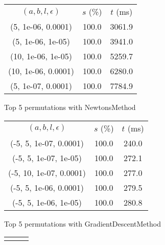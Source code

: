 \begin{figure}[H]
\label{fig:param_comp_NegativeEntropy_DichotomousSearch}
\begin{subfigure}[ht]{.5\textwidth}
\begin{tabular}{|c|c|c|}
\hline
\rowcolor{gray!25}
\multicolumn{3}{|c|}{NewtonsMethod} \\
\hline
\rowcolor{gray!25}
$(a,b,l,\epsilon)$ & $s$ (\%) & $t$ (ms) \\
\hline
(5, 1e-06, 0.0001) & 100.0 & 3061.9 \\
(5, 1e-06, 1e-05) & 100.0 & 3941.0 \\
(10, 1e-06, 1e-05) & 100.0 & 5259.7 \\
(10, 1e-06, 0.0001) & 100.0 & 6280.0 \\
(5, 1e-07, 0.0001) & 100.0 & 7784.9 \\
\hline
\end{tabular}
\caption{Top 5 permutations with NewtonsMethod}
\label{subfig:param_comp_NegativeEntropy_NewtonsMethod_DichotomousSearch}
\end{subfigure}
\hfill
\begin{subfigure}[ht]{.5\textwidth}
\begin{tabular}{|c|c|c|}
\hline
\rowcolor{gray!25}
\multicolumn{3}{|c|}{GradientDescentMethod} \\
\hline
\rowcolor{gray!25}
$(a,b,l,\epsilon)$ & $s$ (\%) & $t$ (ms) \\
\hline
(-5, 5, 1e-07, 0.0001) & 100.0 & 240.0 \\
(-5, 5, 1e-07, 1e-05) & 100.0 & 272.1 \\
(-5, 10, 1e-07, 0.0001) & 100.0 & 277.0 \\
(-5, 5, 1e-06, 0.0001) & 100.0 & 279.5 \\
(-5, 5, 1e-06, 1e-05) & 100.0 & 280.8 \\
\hline
\end{tabular}
\caption{Top 5 permutations with GradientDescentMethod}
\label{subfig:param_comp_NegativeEntropy_GradientDescentMethod_DichotomousSearch}
\end{subfigure}
\hfill
\begin{subfigure}[ht]{.5\textwidth}
\begin{tabular}{|c|c|c|}
\hline
\rowcolor{gray!25}
\multicolumn{3}{|c|}{ConjugateGradientMethod} \\

\end{tabular}
\end{subfigure}
\end{figure}
